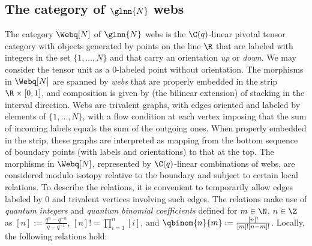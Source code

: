 \subsection{The category of \texorpdfstring{$\glnn{N}$}{gl(N)} webs}
\label{sec:webs}
The category $\Webq[N]$ of $\glnn{N}$ webs is the $\C(q)$-linear pivotal tensor
category with objects generated by points on the line $\R$ that are labeled with
integers in the set $\{1,\dots,N\}$ and that carry an orientation \textit{up} or
\textit{down}. We may consider the tensor unit as a $0$-labeled point without
orientation. The morphisms in $\Webq[N]$ are spanned by \textit{webs} that are
properly embedded in the strip $\R\times [0,1]$, and composition is given by
(the bilinear extension) of stacking in the interval direction. Webs are
trivalent graphs, with edges oriented and labeled by elements of
$\{1,\dots,N\}$, with a flow condition at each vertex imposing that the sum of
incoming labels equals the sum of the outgoing ones. When properly embedded in
the strip, these graphs are interpreted as mapping from the bottom sequence of
boundary points (with labels and orientations) to that at the top. The morphisms
in $\Webq[N]$, represented by $\C(q)$-linear combinations of webs, are
considered modulo isotopy relative to the boundary and subject to certain local
relations. To describe the relations, it is convenient to temporarily allow
edges labeled by $0$ and trivalent vertices involving such edges. The relations
make use of \textit{quantum integers} and \textit{quantum binomial coefficients}
defined for $m\in \N$, $n \in \Z$ as $[n]:=\frac{q^n-q^{-n}}{q-q^{-1}}$,
$[n]!=\prod_{i=1}^n [i]$, and $\qbinom{n}{m}:=\frac{[n]!}{[m]![n-m]!}$. Locally, the following relations hold:

